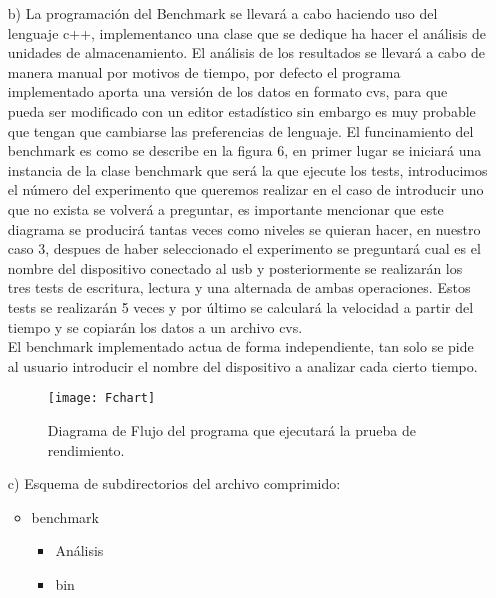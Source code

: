 \documentclass[a4paper, 10pt]{article} %
\begin{document}
\begin{itemize}
\begin{itemize}
\item[b)] La programación del Benchmark se llevará a cabo haciendo uso del lenguaje c++, implementanco una clase que se dedique ha hacer el análisis de unidades de almacenamiento. El análisis de los resultados se llevará a cabo de manera manual por motivos de tiempo, por defecto el programa implementado aporta una versión de los datos en formato cvs, para que pueda ser modificado con un editor estadístico sin embargo es muy probable que tengan que cambiarse las preferencias de lenguaje. El funcinamiento del benchmark es como se describe en la figura 6, en primer lugar se iniciará una instancia de la clase benchmark que será la que ejecute los tests, introducimos el número del experimento que queremos realizar en el caso de introducir uno que no exista se volverá a preguntar, es importante mencionar que este diagrama se producirá tantas veces como niveles se quieran hacer, en nuestro caso 3, despues de haber seleccionado el experimento se preguntará cual es el nombre del dispositivo conectado al usb y posteriormente se realizarán los tres tests de escritura, lectura y una alternada de ambas operaciones. Estos tests se realizarán 5 veces y por último se calculará la velocidad a partir del tiempo y se copiarán los datos a un archivo cvs.\\
El benchmark implementado actua de forma independiente, tan solo se pide al usuario introducir el nombre del dispositivo a analizar cada cierto tiempo.
\begin{figure}[H]
\centering 
\texttt{[image: Fchart]} 
\caption{Diagrama de Flujo del programa que ejecutará la prueba de rendimiento.} 
\label{contexto:figura} 
\end{figure}
\item[c)] Esquema de subdirectorios del archivo comprimido:
\begin{itemize}
\item benchmark
\begin{itemize}
\item Análisis
\item bin
\end{itemize}
\end{itemize}
\end{itemize}
\end{itemize}
\end{document}
